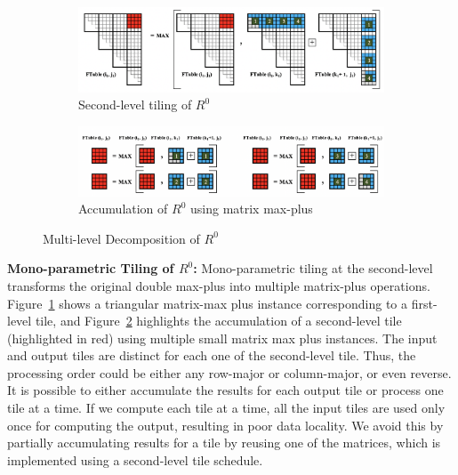 \begin{figure}
\centering
\begin{subfigure}[htbp]{0.48\textwidth}
\centering
\includegraphics[scale=0.36, trim=4 4 4 4,clip]{content/figures/r0_mono_paramteric.png}
\caption{Second-level tiling of $R^{0}$}
\label{fig:mono_parametric_tile_r0}
\end{subfigure}
\hfill
\centering
\vspace{1mm}
\begin{subfigure}[htbp]{0.48\textwidth}
\centering
\includegraphics[scale=0.37, trim=4 4 4 4,clip]{content/figures/r0_max_plus.png}
\caption{Accumulation of $R^{0}$ using matrix max-plus}
\label{fig:matrix_max_plus_accum}
\end{subfigure}
\caption{Multi-level Decomposition of $R^{0}$}
\label{fig:rectangular_matrix_max_plus}
\end{figure}

\textbf{Mono-parametric Tiling of $R^{0}$:}
Mono-parametric tiling at the second-level transforms the original double max-plus into multiple matrix-plus operations.
Figure~\ref{fig:mono_parametric_tile_r0} shows a triangular matrix-max plus instance corresponding to a first-level tile, and Figure~\ref{fig:matrix_max_plus_accum} highlights the accumulation of a second-level tile (highlighted in red) using multiple small matrix max plus instances. The input and output tiles are distinct for each one of the second-level tile. Thus, the processing order could be either any row-major or column-major, or even reverse. It is possible to either accumulate the results for each output tile or process one tile at a time. If we compute each tile at a time, all the input tiles are used only once for computing the output, resulting in poor data locality. We avoid this by partially accumulating results for a tile by reusing one of the matrices, which is implemented using a second-level tile schedule.



